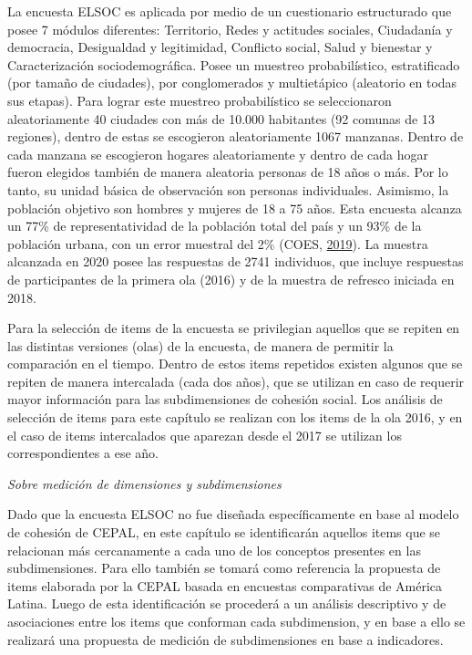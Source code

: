 \documentclass[
  12pt,
]{book}
\begin{document}
La encuesta ELSOC es aplicada por medio de un cuestionario estructurado que posee 7 módulos diferentes: Territorio, Redes y actitudes sociales, Ciudadanía y democracia, Desigualdad y legitimidad, Conflicto social, Salud y bienestar y Caracterización sociodemográfica. Posee un muestreo probabilístico, estratificado (por tamaño de ciudades), por conglomerados y multietápico (aleatorio en todas sus etapas). Para lograr este muestreo probabilístico se seleccionaron aleatoriamente 40 ciudades con más de 10.000 habitantes (92 comunas de 13 regiones), dentro de estas se escogieron aleatoriamente 1067 manzanas. Dentro de cada manzana se escogieron hogares aleatoriamente y dentro de cada hogar fueron elegidos también de manera aleatoria personas de 18 años o más. Por lo tanto, su unidad básica de observación son personas individuales. Asimismo, la población objetivo son hombres y mujeres de 18 a 75 años. Esta encuesta alcanza un 77\% de representatividad de la población total del país y un 93\% de la población urbana, con un error muestral del 2\% (COES, \protect\hyperlink{ref-coes_radiografia_2019}{2019}). La muestra alcanzada en 2020 posee las respuestas de 2741 individuos, que incluye respuestas de participantes de la primera ola (2016) y de la muestra de refresco iniciada en 2018.

Para la selección de items de la encuesta se privilegian aquellos que se repiten en las distintas versiones (olas) de la encuesta, de manera de permitir la comparación en el tiempo. Dentro de estos items repetidos existen algunos que se repiten de manera intercalada (cada dos años), que se utilizan en caso de requerir mayor información para las subdimensiones de cohesión social. Los análisis de selección de items para este capítulo se realizan con los items de la ola 2016, y en el caso de items intercalados que aparezan desde el 2017 se utilizan los correspondientes a ese año.

\emph{Sobre medición de dimensiones y subdimensiones}

Dado que la encuesta ELSOC no fue diseñada específicamente en base al modelo de cohesión de CEPAL, en este capítulo se identificarán aquellos items que se relacionan más cercanamente a cada uno de los conceptos presentes en las subdimensiones. Para ello también se tomará como referencia la propuesta de items elaborada por la CEPAL basada en encuestas comparativas de América Latina. Luego de esta identificación se procederá a un análisis descriptivo y de asociaciones entre los items que conforman cada subdimension, y en base a ello se realizará una propuesta de medición de subdimensiones en base a indicadores.
\end{document}
